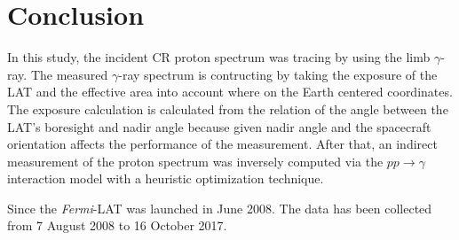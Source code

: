 \chapter{Conclusion}


In this study, the incident CR proton spectrum was tracing by 
using the limb $\gamma$-ray. The measured $\gamma$-ray spectrum
is contructing by taking the exposure of the LAT and
the effective area into account where on the Earth centered 
coordinates. The exposure calculation is calculated from the 
relation of the angle between the LAT's boresight and nadir angle 
because given nadir angle and the spacecraft orientation affects the 
performance of the measurement. After that, an indirect measurement 
of the proton spectrum was inversely computed via the
$pp\rightarrow\gamma$ interaction model with a heuristic optimization
technique.


Since the \textit{Fermi}-LAT was launched in June 2008.
The data has been collected from 7 August 2008 to 16 October 2017.





